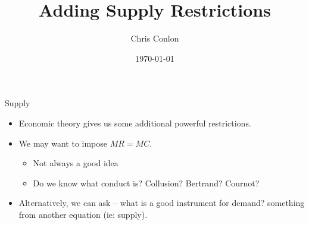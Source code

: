 \def\beamerclassoptions{[xcolor=pdftex,dvipsnames,table,mathserif,aspectratio=169]}


\usepackage[english]{babel}
\usepackage{pgf,pgfarrows,pgfnodes,pgfautomata,pgfheaps}
\usepackage{amsmath,amssymb,setspace,centernot}
\usepackage[latin1]{inputenc}
\usepackage[T1]{fontenc}
\usepackage{relsize}
\usepackage{pdfpages}
\usepackage[absolute,overlay]{textpos} 

\newenvironment{reference}[2]{%
  \begin{textblock*}{\textwidth}(#1,#2) 
      \footnotesize\it\bgroup\color{red!50!black}}{\egroup\end{textblock*}} 




\newcommand{\norm}[1]{\left\lVert#1\right\rVert}
\newcommand{\X}{\mathtt{X}}
\newcommand{\Y}{\mathtt{Y}}

\newcommand{\p}{\mathbb{P}}
\newcommand*\df{\mathop{}\!\mathrm{d}}
\newcommand{\del}{\partial}


\title{Adding Supply Restrictions }
\author{Chris Conlon}
\date{\today}

\frame{\titlepage}

\begin{frame}{Supply}
\begin{itemize}
\item Economic theory gives us some additional powerful restrictions.
\item We may want to impose $MR = MC$.
\begin{itemize}
\item Not always a good idea
\item Do we know what conduct is? Collusion? Bertrand? Cournot?
\end{itemize}

\item Alternatively, we can ask -- what is a good instrument for demand? \alert{something from another equation} (ie: supply).
\end{itemize}
\end{frame}

